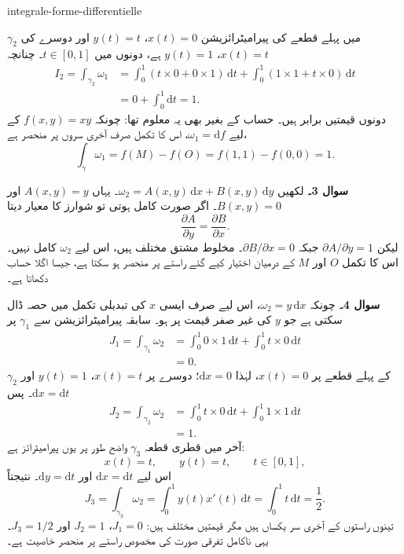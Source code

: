 \begin{exo}{integrale-forme-differentielle}
\begin{solution}
$\gamma_2$ میں پہلے قطعے کی پیرامیٹرائزیشن $x(t)=0$، $y(t)=t$ اور دوسرے کی
$x(t)=t$، $y(t)=1$ ہے، دونوں میں $t\in[0,1]$۔ چنانچہ
\[
\begin{aligned}
I_2
= \int_{\gamma_2}\omega_1
&= \int_0^1\left(t\times 0+0\times 1\right)\,\mathrm{d}t
 + \int_0^1\left(1\times 1+t\times 0\right)\,\mathrm{d}t \\
&= 0+\int_0^1\mathrm{d}t = 1.
\end{aligned}
\]
دونوں قیمتیں برابر ہیں۔ حساب کے بغیر بھی یہ معلوم تھا: چونکہ $f(x,y)=xy$
کے لیے $\omega_1=\mathrm{d}f$، اس کا تکمل صرف آخری سروں پر منحصر ہے،
\[
\int_\gamma\omega_1=f(M)-f(O)=f(1,1)-f(0,0)=1.
\]

\textbf{سوال 3۔} لکھیں $\omega_2=A(x,y)\,\mathrm{d}x+B(x,y)\,\mathrm{d}y$۔
یہاں $A(x,y)=y$ اور $B(x,y)=0$۔ اگر صورت کامل ہوتی تو شوارز کا معیار دیتا
\[
\frac{\partial A}{\partial y}=\frac{\partial B}{\partial x}.
\]
لیکن $\partial A/\partial y=1$ جبکہ $\partial B/\partial x=0$۔ مخلوط مشتق
مختلف ہیں، اس لیے $\omega_2$ کامل نہیں۔ اس کا تکمل $O$ اور $M$ کے درمیان
اختیار کیے گئے راستے پر منحصر ہو سکتا ہے، جیسا اگلا حساب دکھاتا ہے۔

\textbf{سوال 4۔} چونکہ $\omega_2=y\,\mathrm{d}x$، اس لیے صرف ایسی $x$ کی تبدیلی
تکمل میں حصہ ڈال سکتی ہے جو $y$ کی غیر صفر قیمت پر ہو۔ سابقہ پیرامیٹرائزیشن
سے $\gamma_1$ پر
\[
\begin{aligned}
J_1
=\int_{\gamma_1}\omega_2
&=\int_0^1 0\times 1\,\mathrm{d}t
  +\int_0^1 t\times 0\,\mathrm{d}t \\
&=0.
\end{aligned}
\]
$\gamma_2$ کے پہلے قطعے پر $x(t)=0$، لہٰذا $\mathrm{d}x=0$؛ دوسرے پر
$x(t)=t$، $y(t)=1$ اور $\mathrm{d}x=\mathrm{d}t$۔ پس
\[
\begin{aligned}
J_2
=\int_{\gamma_2}\omega_2
&=\int_0^1 t\times 0\,\mathrm{d}t
  +\int_0^1 1\times 1\,\mathrm{d}t \\
&=1.
\end{aligned}
\]
آخر میں قطری قطعہ $\gamma_3$ واضح طور پر یوں پیرامیٹرائز ہے:
\[
x(t)=t,\qquad y(t)=t,\qquad t\in[0,1],
\]
اس لیے $\mathrm{d}x=\mathrm{d}t$ اور $\mathrm{d}y=\mathrm{d}t$۔ نتیجتاً
\[
J_3
=\int_{\gamma_3}\omega_2
=\int_0^1 y(t)x'(t)\,\mathrm{d}t
=\int_0^1 t\,\mathrm{d}t
=\frac12.
\]
تینوں راستوں کے آخری سر یکساں ہیں مگر قیمتیں مختلف ہیں: $J_1=0$، $J_2=1$
اور $J_3=1/2$۔ یہی ناکامل تفرقی صورت کی مخصوص راستے پر منحصر خاصیت ہے۔
\end{solution}
\end{exo}

